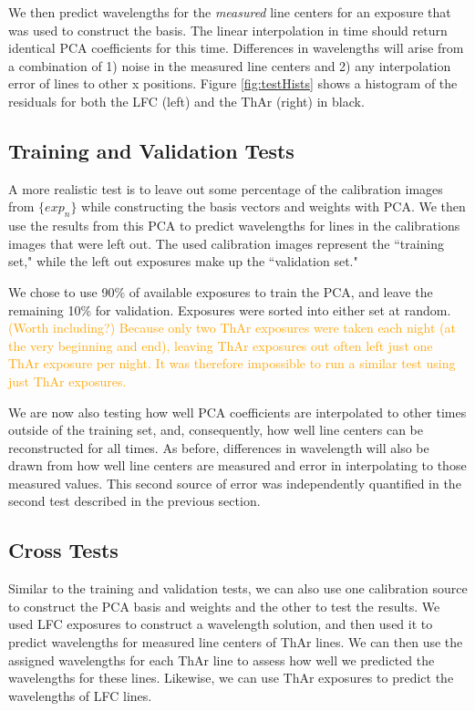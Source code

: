 \documentclass[12pt, letterpaper]{article}
\newcommand{\lz}[1]{\textcolor{orange}{#1}}
\begin{document}
We then predict wavelengths for the \textit{measured} line centers for an exposure that was used to construct the basis.  The linear interpolation in time should return identical PCA coefficients for this time.  Differences in wavelengths will arise from a combination of 1) noise in the measured line centers and 2) any interpolation error of lines to other x positions.  Figure \ref{fig:testHists} shows a histogram of the residuals for both the LFC (left) and the ThAr (right) in black.

\subsection{Training and Validation Tests} \label{sec:test-trainNvalid}
A more realistic test is to leave out some percentage of the calibration images from $\{exp_n\}$ while constructing the basis vectors and weights with PCA.  We then use the results from this PCA to predict wavelengths for lines in the calibrations images that were left out.  The used calibration images represent the ``training set," while the left out exposures make up the ``validation set."

We chose to use 90\% of available exposures to train the PCA, and leave the remaining 10\% for validation.  Exposures were sorted into either set at random.  \lz{(Worth including?) Because only two ThAr exposures were taken each night (at the very beginning and end), leaving ThAr exposures out often left just one ThAr exposure per night.  It was therefore impossible to run a similar test using just ThAr exposures.}

We are now also testing how well PCA coefficients are interpolated to other times outside of the training set, and, consequently, how well line centers can be reconstructed for all times.  As before, differences in wavelength will also be drawn from how well line centers are measured and error in interpolating to those measured values.  This second source of error was independently quantified in the second test described in the previous section.

\subsection{Cross Tests} \label{sec:test-cross}
Similar to the training and validation tests, we can also use one calibration source to construct the PCA basis and weights and the other to test the results.  We used LFC exposures to construct a wavelength solution, and then used it to predict wavelengths for measured line centers of ThAr lines.  We can then use the assigned wavelengths for each ThAr line to assess how well we predicted the wavelengths for these lines.  Likewise, we can use ThAr exposures to predict the wavelengths of LFC lines.
\end{document}
